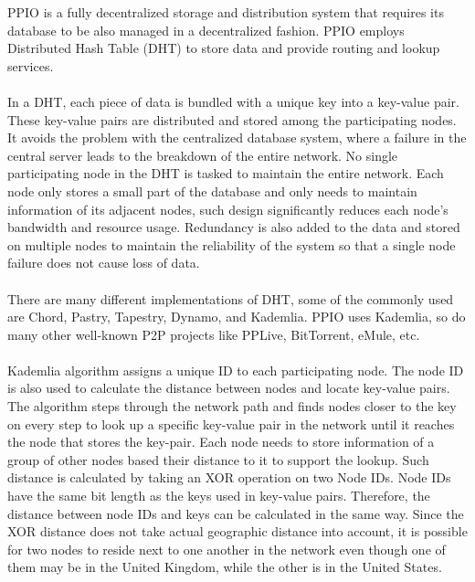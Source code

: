 \documentclass[10pt,a4paper]{article}
\begin{document}
PPIO is a fully decentralized storage and distribution system that requires its database to be also managed in a decentralized fashion. PPIO employs Distributed Hash Table (DHT) to store data and provide routing and lookup services.\\
\vspace{-0.5em}
\\In a DHT, each piece of data is bundled with a unique key into a key-value pair. These key-value pairs are distributed and stored among the participating nodes. It avoids the problem with the centralized database system, where a failure in the central server leads to the breakdown of the entire network. No single participating node in the DHT is tasked to maintain the entire network. Each node only stores a small part of the database and only needs to maintain information of its adjacent nodes, such design significantly reduces each node’s bandwidth and resource usage. Redundancy is also added to the data and stored on multiple nodes to maintain the reliability of the system so that a single node failure does not cause loss of data.
\vspace{-0.5em}
 \\ \\ There are many different implementations of DHT, some of the commonly used are Chord\cite{article14}, Pastry\cite{article15}, Tapestry\cite{article18}, Dynamo\cite{article19}, and Kademlia\cite{article16}. PPIO uses Kademlia, so do many other well-known P2P projects like PPLive, BitTorrent, eMule, etc.
 \vspace{-0.5em}
 \\ \\Kademlia algorithm assigns a unique ID to each participating node. The node ID is also used to calculate the distance between nodes and locate key-value pairs. The algorithm steps through the network path and finds nodes closer to the key on every step to look up a specific key-value pair in the network until it reaches the node that stores the key-pair. Each node needs to store information of a group of other nodes based their distance to it to support the lookup. Such distance is calculated by taking an XOR operation on two Node IDs. Node IDs have the same bit length as the keys used in key-value pairs. Therefore, the distance between node IDs and keys can be calculated in the same way. Since the XOR distance does not take actual geographic distance into account, it is possible for two nodes to reside next to one another in the network even though one of them may be in the United Kingdom, while the other is in the United States.
\end{document}

